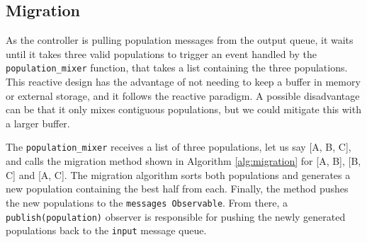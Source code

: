 \subsection{Migration}
\label{migration}

As the controller is pulling population messages from the output queue, it waits
until it takes three valid populations to trigger an event handled by the
\texttt{population\_mixer}  function, that takes a list containing the three
populations. This reactive design has the advantage of not needing to keep a
buffer in memory or external storage, and it follows the reactive paradigm. A
possible disadvantage can be that it only mixes contiguous populations, but we
could mitigate this with a larger buffer.

The \texttt{population\_mixer} receives a list of three populations, let us say
[A, B, C], and calls the migration method shown in Algorithm \ref{alg:migration}
for [A, B], [B, C] and [A, C]. The migration algorithm sorts both populations
and generates a new population containing the best half from each. Finally, the
method pushes the new populations to the \texttt{messages Observable}. From
there, a \texttt{publish(population)} observer is responsible for pushing the
newly generated populations back to the \texttt{input} message queue.


